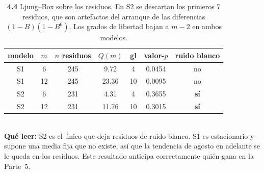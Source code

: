 \begin{table}[htbp]
\centering
\footnotesize
\caption{\textbf{4.4} Ljung--Box sobre los residuos. En S2 se descartan los primeros 7 residuos, que son artefactos del arranque de las diferencias $(1-B)(1-B^6)$. Los grados de libertad bajan a $m-2$ en ambos modelos.}
\label{tab:p4_diagnostico}
\begin{tabular}{ccccccc}
\toprule
\textbf{modelo} & \textbf{$m$} & \textbf{$n$ residuos} & \textbf{$Q(m)$} & \textbf{gl} & \textbf{valor-$p$} & \textbf{ruido blanco} \\
\midrule
S1 & 6 & 245 & 9.72 & 4 & 0.0454 & no \\
S1 & 12 & 245 & 23.36 & 10 & 0.0095 & no \\
S2 & 6 & 231 & 4.31 & 4 & 0.3655 & \textbf{s\'i} \\
S2 & 12 & 231 & 11.76 & 10 & 0.3015 & \textbf{s\'i} \\
\bottomrule
\end{tabular}
\\[0.3em]{\scriptsize \textbf{Qu\'e leer:} S2 es el \'unico que deja residuos de ruido blanco. S1 es estacionario y supone una media fija que no existe, as\'i que la tendencia de agosto en adelante se le queda en los residuos. Este resultado anticipa correctamente qui\'en gana en la Parte~5.}
\end{table}
